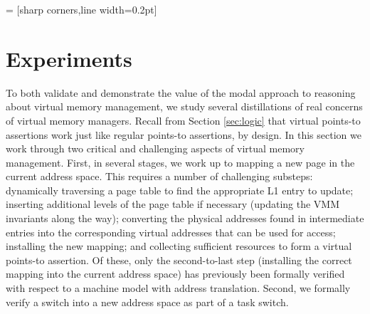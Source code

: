 \newcommand{\sumwalkabsent}{
  \ownGhost\gammaPred{\authfrag{\singletonMap{\texttt{entry+KERNBASE}}{(\textsf{qfrac}, \textsf{entry})}}}
}


\newcommand{\ventry}{\texttt{entry + KERNBASE}}
\newcommand{\entry}{\texttt{entry}}
\newcommand{\qfraczero}{\textsf{qfrac}}
\newcommand{\true}{\textsf{true}}
 = [sharp corners,line width=0.2pt]
\NewDocumentCommand {}
\newcommand*{\knowInvpv}[2]{\boxedassertpv{#2}[#1]}
\newcommand*{\ownGhostpv}[2]{\boxedassertpv[dash dot]{#2}[#1]}

\newcommand{\sumpv}[3]{
  \ownGhostpv\gammaPred{\authfrag{\singletonMap{#1}{(#2, #3)}}}
}

\newcommand{\pvmapping}[1]{\mathcal{A}\textsf{PVMappings}(#1)}


\newcommand{\fpaddr}{\texttt{fpaddr}}
\newcommand{\specline}[1]{{\color{blue}\left\{#1\right\}}}
\newcommand{\sumapacesfull}[2]{
  \ownGhost\gammaPreds{\authfull{\singletonMap{#1}{#2}}}
}
\section{Experiments}
\label{sec:experiment}
To both validate and demonstrate the value of the modal approach to reasoning about virtual memory management, we study several
distillations of real concerns of virtual memory managers.
Recall from Section \ref{sec:logic} that virtual points-to assertions work just like regular points-to assertions, by design.
In this section we work through two critical and challenging aspects of virtual memory management.
First, in several stages, we work up to mapping a new page in the current address space.
This requires a number of challenging substeps: dynamically traversing a page table to find
the appropriate L1 entry to update; inserting additional levels of the page table if necessary (updating
the VMM invariants along the way);
converting the physical addresses found in intermediate entries into the corresponding virtual addresses
that can be used for access;
installing the new mapping;
and collecting sufficient resources to form a virtual points-to assertion.
Of these, only the second-to-last step (installing the correct mapping into the
current address space) has previously been formally verified with respect to a machine model with address translation.
Second, we formally verify a switch into a new address space as part of a task switch.

